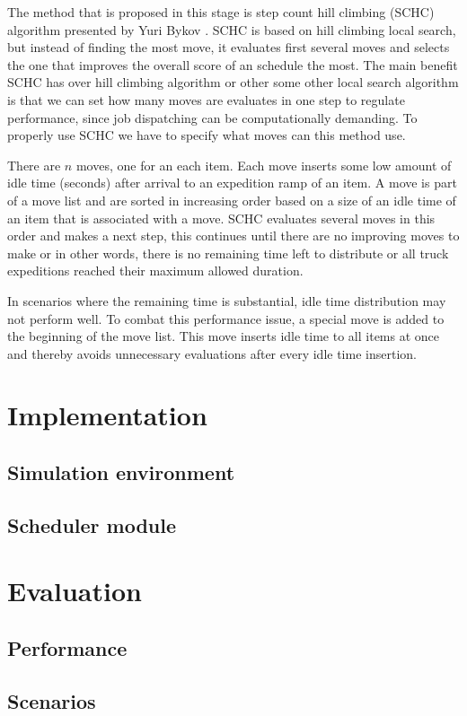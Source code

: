 \documentclass{ctuthesis}
\begin{document}
The method that is proposed in this stage is step count hill climbing (SCHC) algorithm presented by Yuri Bykov \cite{yuri}. SCHC is based on hill climbing local search, but instead of finding the most move, it evaluates first several moves and selects the one that improves the overall score of an schedule the most. The main benefit SCHC has over hill climbing algorithm or other some other local search algorithm is that we can set how many moves are evaluates in one step to regulate performance, since job dispatching can be computationally demanding. To properly use SCHC we have to specify what moves can this method use. 

There are $n$ moves, one for an each item. Each move inserts some low amount of idle time (seconds) after arrival to an expedition ramp of an item. A move is part of a move list and are sorted in increasing order based on a size of an idle time of an item that is associated with a move. SCHC evaluates several moves in this order and makes a next step, this continues until there are no improving moves to make or in other words, there is no remaining time left to distribute or all truck expeditions reached their maximum allowed duration.

In scenarios where the remaining time is substantial, idle time distribution may not perform well. To combat this performance issue, a special move is added to the beginning of the move list. This move inserts idle time to all items at once and thereby avoids unnecessary evaluations after every idle time insertion.

\chapter{Implementation}
\section{Simulation environment}
\section{Scheduler module}
\chapter{Evaluation}
\label{ch:Evaluation}
\section{Performance}
\section{Scenarios}
\end{document}
